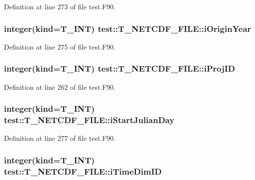 Definition at line 273 of file test.F90.

\hypertarget{typetest_1_1_t___n_e_t_c_d_f___f_i_l_e_a9344a80adfc18dbfc33cfbe0eb9c33e4}{
\subsubsection[{iOriginYear}]{\setlength{\rightskip}{0pt plus 5cm}integer(kind={\bf T\_\-INT}) {\bf test::T\_\-NETCDF\_\-FILE::iOriginYear}}}
\label{typetest_1_1_t___n_e_t_c_d_f___f_i_l_e_a9344a80adfc18dbfc33cfbe0eb9c33e4}


Definition at line 275 of file test.F90.

\hypertarget{typetest_1_1_t___n_e_t_c_d_f___f_i_l_e_a9c7fc25d52947f02ad49080f3a26c8fc}{
\subsubsection[{iProjID}]{\setlength{\rightskip}{0pt plus 5cm}integer(kind={\bf T\_\-INT}) {\bf test::T\_\-NETCDF\_\-FILE::iProjID}}}
\label{typetest_1_1_t___n_e_t_c_d_f___f_i_l_e_a9c7fc25d52947f02ad49080f3a26c8fc}


Definition at line 262 of file test.F90.

\hypertarget{typetest_1_1_t___n_e_t_c_d_f___f_i_l_e_a125b2864157d2a24cef072b70b760c1d}{
\subsubsection[{iStartJulianDay}]{\setlength{\rightskip}{0pt plus 5cm}integer(kind={\bf T\_\-INT}) {\bf test::T\_\-NETCDF\_\-FILE::iStartJulianDay}}}
\label{typetest_1_1_t___n_e_t_c_d_f___f_i_l_e_a125b2864157d2a24cef072b70b760c1d}


Definition at line 277 of file test.F90.

\hypertarget{typetest_1_1_t___n_e_t_c_d_f___f_i_l_e_ad644bb6b3487f1988d091d2fd60c19aa}{
\subsubsection[{iTimeDimID}]{\setlength{\rightskip}{0pt plus 5cm}integer(kind={\bf T\_\-INT}) {\bf test::T\_\-NETCDF\_\-FILE::iTimeDimID}}}
\label{typetest_1_1_t___n_e_t_c_d_f___f_i_l_e_ad644bb6b3487f1988d091d2fd60c19aa}


